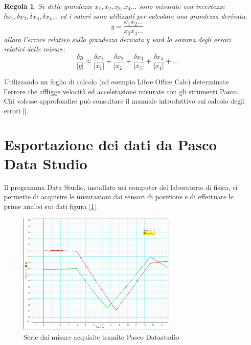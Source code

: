 \documentclass[a4paper,10pt,oneside]{article}
\newtheorem{regola}{Regola}
\begin{document}
\begin{regola}

Se delle grandezze $x_1,x_2,x_3,x_4\ldots$ sono misurate con incertezze $\delta x_1,\delta x_2,\delta x_3,\delta x_4\ldots$ ed i valori sono utilizzati per calcolare una grandezza derivata:
\begin{equation*}
 y=\frac{x_1 x_2\ldots}{x_3 x_4\ldots}
\end{equation*}
allora l'errore relativo sulla grandezza derivata $y$ sarà la somma degli errori relativi delle misure:
\begin{equation*}
 \frac{\delta y}{|y|}\approx \frac{\delta x_1}{|x_1|}+\frac{\delta x_2}{|x_2|} +\frac{\delta x_3}{|x_3|}+\frac{\delta x_4}{|x_4|}+\ldots
\end{equation*}

\end{regola}

Utilizzando un foglio di calcolo (ad esempio Libre Office Calc) determinate l'errore che affligge velocità ed accelerazione misurate con gli strumenti Pasco. Chi volesse approfondire può consultare il manuale introduttivo sul calcolo degli errori  [\cite{taylor}].

\section*{Esportazione dei dati da Pasco Data Studio}
Il programma Data Studio, installato nei computer del laboratorio di fisica, ci permette di acquisire le misurazioni dai sensori di posizione e di effettuare le prime analisi sui dati figura [\ref{fig:pasco_dati1}].
\begin{figure}[H]
 \centering
 \includegraphics[width=0.7\textwidth]{./Immagini/pasco2.png}
 \caption{Serie dai misure acquisite tramite Pasco Datastudio}
 \label{fig:pasco_dati1}
\end{figure}
\end{document}
